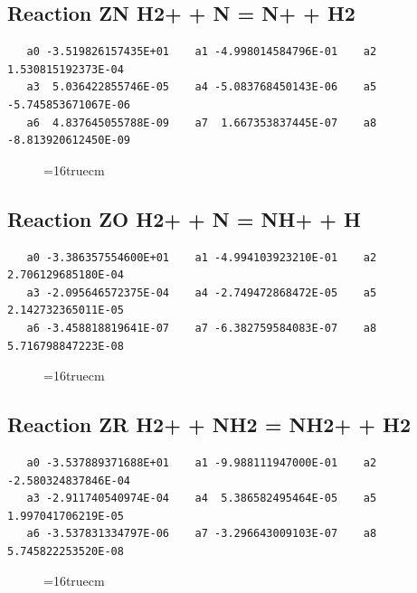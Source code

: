 \documentclass[12pt]{article}
\begin{document}
\subsection{
Reaction ZN H2+ + N = N+ + H2}
\begin{small}\begin{verbatim}
   a0 -3.519826157435E+01    a1 -4.998014584796E-01    a2  1.530815192373E-04
   a3  5.036422855746E-05    a4 -5.083768450143E-06    a5 -5.745853671067E-06
   a6  4.837645055788E-09    a7  1.667353837445E-07    a8 -8.813920612450E-09
   \end{verbatim}\end{small}
\begin{figure}[h!] \label{n2rates}
\epsfxsize=16truecm
\end{figure}
\newpage

\subsection{
Reaction ZO H2+ + N = NH+ + H}
\begin{small}\begin{verbatim}
   a0 -3.386357554600E+01    a1 -4.994103923210E-01    a2  2.706129685180E-04
   a3 -2.095646572375E-04    a4 -2.749472868472E-05    a5  2.142732365011E-05
   a6 -3.458818819641E-07    a7 -6.382759584083E-07    a8  5.716798847223E-08
   \end{verbatim}\end{small}
\begin{figure}[h!] \label{n2rates}
\epsfxsize=16truecm
\end{figure}
\newpage

\subsection{
Reaction ZR H2+ + NH2 = NH2+ + H2}
\begin{small}\begin{verbatim}
   a0 -3.537889371688E+01    a1 -9.988111947000E-01    a2 -2.580324837846E-04
   a3 -2.911740540974E-04    a4  5.386582495464E-05    a5  1.997041706219E-05
   a6 -3.537831334797E-06    a7 -3.296643009103E-07    a8  5.745822253520E-08
   \end{verbatim}\end{small}
\begin{figure}[h!] \label{n2rates}
\epsfxsize=16truecm
\end{figure}
\newpage
\end{document}
